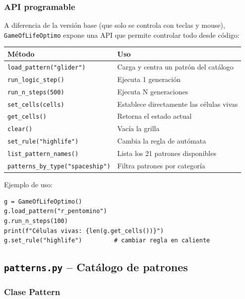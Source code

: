 \documentclass[12pt,a4paper]{article}
\begin{document}
\subsubsection{API programable}

A diferencia de la versión base (que solo se controla con teclas y mouse),
\texttt{GameOfLifeOptimo} expone una API que permite controlar todo desde código:

\begin{table}[h]
\centering
\begin{tabular}{ll}
\toprule
\textbf{Método} & \textbf{Uso} \\
\midrule
\texttt{load\_pattern("glider")}  & Carga y centra un patrón del catálogo \\
\texttt{run\_logic\_step()}       & Ejecuta 1 generación \\
\texttt{run\_n\_steps(500)}       & Ejecuta N generaciones \\
\texttt{set\_cells(cells)}        & Establece directamente las células vivas \\
\texttt{get\_cells()}             & Retorna el estado actual \\
\texttt{clear()}                  & Vacía la grilla \\
\texttt{set\_rule("highlife")}    & Cambia la regla de autómata \\
\texttt{list\_pattern\_names()}   & Lista los 21 patrones disponibles \\
\texttt{patterns\_by\_type("spaceship")} & Filtra patrones por categoría \\
\bottomrule
\end{tabular}
\end{table}

Ejemplo de uso:
\begin{lstlisting}
g = GameOfLifeOptimo()
g.load_pattern("r_pentomino")
g.run_n_steps(100)
print(f"Células vivas: {len(g.get_cells())}")
g.set_rule("highlife")         # cambiar regla en caliente
\end{lstlisting}

\subsection{\texttt{patterns.py} -- Catálogo de patrones}

\subsubsection{Clase Pattern}
\end{document}
